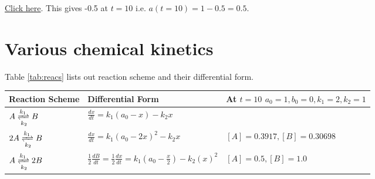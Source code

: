 \documentclass[a4paper,10pt]{article}
\begin{document}
\href{http://www.wolframalpha.com/input/?i=-+y%27%3D2%281%2By%29-1%280-2y%29^2%2C++y%280%29+%3D+0%2C+t+%3D+10&h=1}{Click
here}. This gives -0.5 at $t = 10$ i.e. $a(t=10) = 1 - 0.5 = 0.5 $.



\section{Various chemical kinetics}

Table \ref{tab:reacs} lists out reaction scheme and their differential form.


\begin{table*}[h]
    \begin{tabular}{p{} p{} p{}}
        Reaction Scheme & Differential Form & At $t = 10$ \newline $a_0=1,b_0=0, k_1=2,k_2=1$  \\
        \hline
        $A \xrightleftharpoons[k_2]{k_1} B$ & $\frac{dx}{dt} = k_1(a_0 -x) - k_2 x $ &  \\
        $2A \xrightleftharpoons[k_2]{k_1} B$ & $\frac{dx}{dt} = k_1(a_0 - 2x)^2 - k_2 x$ & $[A] = 0.3917, [B]= 0.30698$ \\
        $A \xrightleftharpoons[k_2]{k_1} 2B$ & $\frac{1}{2} \frac{dB}{dt} = \frac{1}{2} \frac{dx}{dt} = k_1(a_0 - \frac{x}{2}) - k_2(x)^2$ & $[A] = 0.5, [B]= 1.0$ \\
    \end{tabular}
    \caption{Differential equation equivalents of some common chemical kinetics.
    For all computations we had $a_0 = 1.0$, $b_0 = 0.0$, $k_1 = 2.0$, and
$k_2=1.0$. In all of these cases, the ratio of $\frac{k_1}{k_2}$ is 2.0 which
should be same }
    \label{tab:reacs}
\end{table*}
\end{document}
